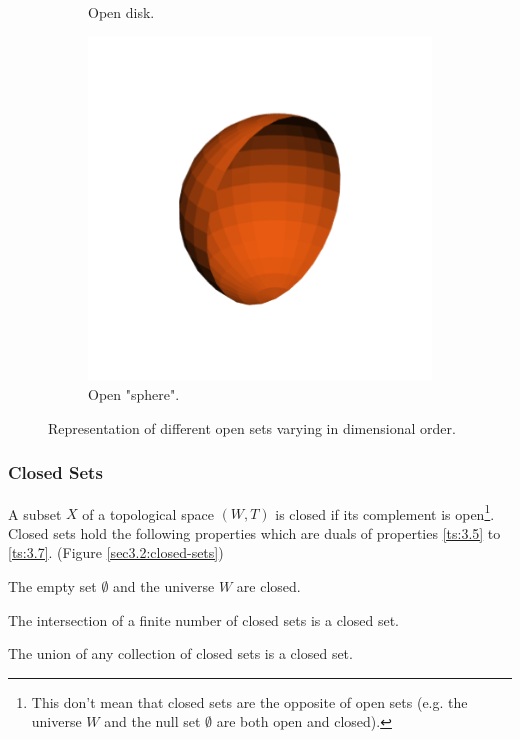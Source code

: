 \documentclass[a4paper,11pt,oneside]{article}
\begin{document}
\begin{figure}[ht]
\begin{subfigure}[b]{0.2\textwidth}
		\caption{Open disk.}
	\end{subfigure}
	\hfill
	\begin{subfigure}[b]{0.2\textwidth}
		\centering
		\includegraphics[width=\textwidth]{section3/3.2/open-sphere.png}
		\caption{Open "sphere".}
	\end{subfigure}
	\hfill
	\caption{Representation of different open sets varying in dimensional order.}
	\label{sec3.2:open-sets}
\end{figure}

   
    
\subsubsection{Closed Sets}
\begin{definition}
	A subset $X$ of a topological space $(W, T)$ is closed if its complement is open\footnote{This don't mean that closed sets are the opposite of open sets (e.g. the universe $W$ and the null set $\emptyset$ are both open and closed)\cite{mansfield_1987}.}. Closed sets hold the following properties which are duals of properties \eqref{ts:3.5} to \eqref{ts:3.7}. (Figure \ref{sec3.2:closed-sets})
			    
	\begin{property}
		The empty set $\emptyset$ and the universe $W$ are closed. \cite{mansfield_1987}
	\end{property}
	\begin{property}
		The intersection of a finite number of closed sets is a closed set. \cite{mansfield_1987}
	\end{property}
	\begin{property}
		The union of any collection of closed sets is a closed set. \cite{mansfield_1987}
	\end{property}
\end{definition}
    
\end{document}
